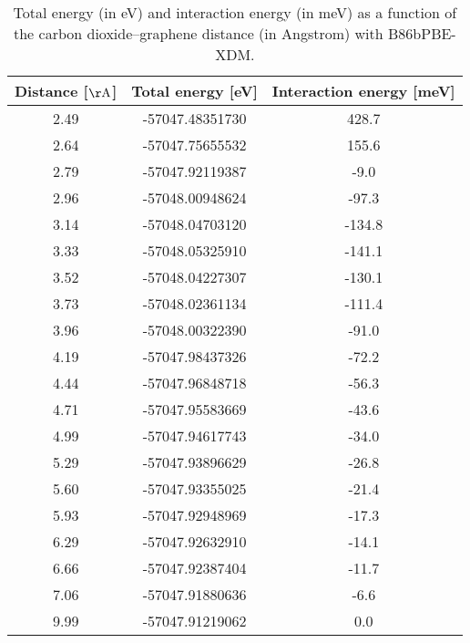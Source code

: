 \begin{table}[h]
\centering
\begin{tabular}{ccc}
\hline
Distance [$\mathrm{\AA}$] & Total energy [eV] & Interaction energy [meV] \\
\hline
2.49 & -57047.48351730 & 428.7 \\
2.64 & -57047.75655532 & 155.6 \\
2.79 & -57047.92119387 & -9.0 \\
2.96 & -57048.00948624 & -97.3 \\
3.14 & -57048.04703120 & -134.8 \\
3.33 & -57048.05325910 & -141.1 \\
3.52 & -57048.04227307 & -130.1 \\
3.73 & -57048.02361134 & -111.4 \\
3.96 & -57048.00322390 & -91.0 \\
4.19 & -57047.98437326 & -72.2 \\
4.44 & -57047.96848718 & -56.3 \\
4.71 & -57047.95583669 & -43.6 \\
4.99 & -57047.94617743 & -34.0 \\
5.29 & -57047.93896629 & -26.8 \\
5.60 & -57047.93355025 & -21.4 \\
5.93 & -57047.92948969 & -17.3 \\
6.29 & -57047.92632910 & -14.1 \\
6.66 & -57047.92387404 & -11.7 \\
7.06 & -57047.91880636 & -6.6 \\
9.99 & -57047.91219062 & 0.0 \\
\hline
\end{tabular}
\caption{Total energy (in eV) and interaction energy (in meV) as a function of the carbon dioxide--graphene distance (in Angstrom) with B86bPBE-XDM.}
\label{SI_dft_table_B86bPBE-XDM}
\end{table}